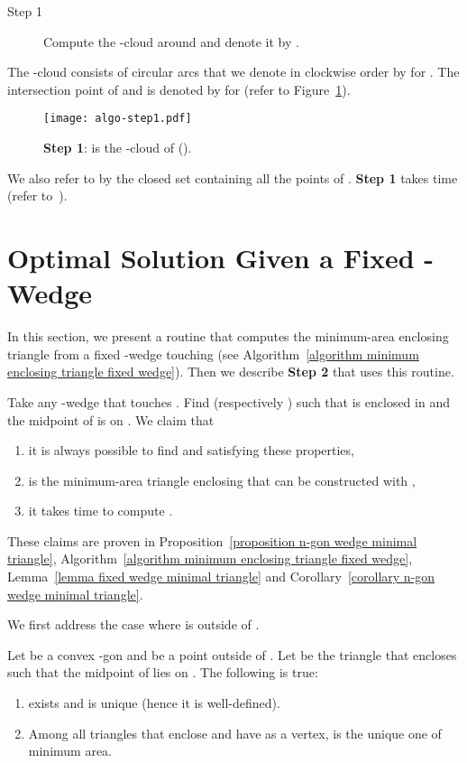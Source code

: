 \documentclass[11pt, oneside]{article}
\begin{document}
\begin{description}
\item[Step 1] Compute the -cloud around 
and denote it by .
\end{description}
The -cloud  consists of  circular arcs
that we denote in clockwise order by  for .
The intersection point of  and  
is denoted by  for 
(refer to Figure~\ref{figure algo-step1}).
\begin{figure}
\centering
\texttt{[image: algo-step1.pdf]}
\caption{{\bf Step 1}:  is the -cloud of  ().\label{figure algo-step1}}
\end{figure}
We also refer to  by the closed set 
containing all the points of .
{\bf Step 1} takes  time
(refer to~\cite{DBLP:journals/ijcga/BoseMSS11}).




\section{Optimal Solution Given a Fixed -Wedge}
\label{section optimal solution given omega wedge}




In this section,
we present a routine that computes the minimum-area enclosing triangle
from a fixed -wedge touching 
(see Algorithm~\ref{algorithm minimum enclosing triangle fixed wedge}).
Then we describe {\bf Step 2}
that uses this routine.

Take any -wedge  
that touches .
Find 
(respectively )
such that  is enclosed in 
and the midpoint  of  is on .
We claim that
\begin{enumerate}
\item it is always possible to find  and  satisfying these properties,

\item  is the minimum-area triangle enclosing 
that can be constructed with ,
 
\item it takes  time to compute .
\end{enumerate}
These claims are proven 
in Proposition~\ref{proposition n-gon wedge minimal triangle},
Algorithm~\ref{algorithm minimum enclosing triangle fixed wedge},
Lemma~\ref{lemma fixed wedge minimal triangle}
and Corollary~\ref{corollary n-gon wedge minimal triangle}.

We first address the case where  is outside of .
\begin{proposition}
\label{proposition n-gon wedge minimal triangle}
Let  be a convex -gon
and  be a point outside of .
Let  be the triangle that encloses  
such that the midpoint  of  lies on .
The following is true:
\begin{enumerate}
\item\label{proposition n-gon wedge minimal triangle item exists unique}
 exists and is unique
(hence it is well-defined).

\item\label{proposition n-gon wedge minimal triangle item minimality}
Among all triangles that enclose 
and have  as a vertex,
 is the unique one of minimum area.
\end{enumerate}
\end{proposition}
\end{document}
